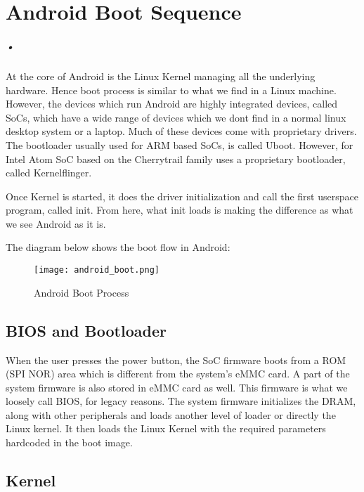 

\chapter{Android Boot Sequence}
\label{android_boot}
\paragraph*{•}

\hspace{8mm} 

\noindent At the core of Android is the Linux Kernel managing all the underlying hardware. Hence boot process is
similar to what we find in a Linux machine. However, the devices which run Android are highly
integrated devices, called SoCs, which have a wide range of devices which we dont find in
a normal linux desktop system or a laptop. Much of these devices come with proprietary drivers.
The bootloader usually used for ARM based SoCs, is called Uboot. However, for Intel Atom SoC
based on the Cherrytrail family uses a proprietary bootloader, called Kernelflinger.

Once Kernel is started, it does the driver initialization and call the first userspace program,
called init. From here, what init loads is making the difference as what we see Android as it is.

The diagram below shows the boot flow in Android:


\begin{figure}[h]
  \centering
    \texttt{[image: android\_boot.png]}
    \caption{Android Boot Process}
    \label{fig:android_boot}
\end{figure}

\clearpage
\section{BIOS and Bootloader}

When the user presses the power button, the SoC firmware boots from a ROM (SPI NOR)
area which is different from the system's eMMC card. A part of the system
firmware is also stored in eMMC card as well. This firmware is what we
loosely call BIOS, for legacy reasons. The system firmware initializes
the DRAM, along with other peripherals and loads another
level of loader or directly the Linux kernel. It then loads the Linux Kernel
with the required parameters hardcoded in the boot image.

\section{Kernel}

